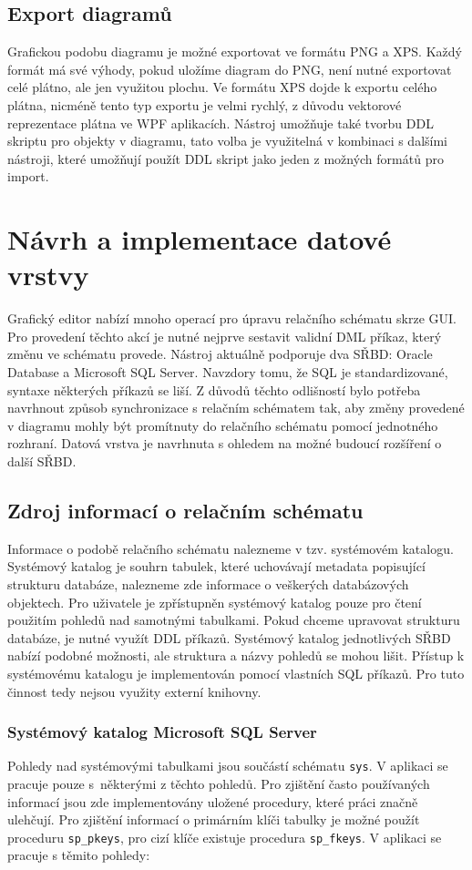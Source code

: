 \documentclass[czech,bachelor,public,dept460,male,oneside]{diploma}
\begin{document}
	\subsection{Export diagramů}
	Grafickou podobu diagramu je možné exportovat ve formátu PNG a XPS. Každý formát má své výhody, pokud uložíme diagram do PNG, není nutné exportovat celé plátno, ale jen využitou plochu. Ve formátu XPS dojde k exportu celého plátna, nicméně tento typ exportu je velmi rychlý, z důvodu vektorové reprezentace plátna ve WPF aplikacích. Nástroj umožňuje také tvorbu DDL skriptu pro objekty v diagramu, tato volba je využitelná v kombinaci s dalšími nástroji, které umožňují použít DDL skript jako jeden z možných formátů pro import.
		
\newpage
\section{Návrh a implementace datové vrstvy}
Grafický editor nabízí mnoho operací pro úpravu relačního schématu skrze GUI. Pro provedení těchto akcí je nutné nejprve sestavit validní DML příkaz, který změnu ve schématu provede. Nástroj aktuálně podporuje dva SŘBD: Oracle Database a Microsoft SQL Server. Navzdory tomu, že SQL je standardizované, syntaxe některých příkazů se liší. Z důvodů těchto odlišností bylo potřeba navrhnout způsob synchronizace s relačním schématem tak, aby změny provedené v diagramu mohly být promítnuty do relačního schématu pomocí jednotného rozhraní. Datová vrstva je navrhnuta s ohledem na možné budoucí rozšíření o další SŘBD.
	
	\subsection{Zdroj informací o relačním schématu} \label{secDataSource}
	Informace o podobě relačního schématu nalezneme v tzv. systémovém katalogu. Systémový katalog je souhrn tabulek, které uchovávají metadata popisující strukturu databáze, nalezneme zde informace o veškerých databázových objektech. Pro uživatele je zpřístupněn systémový katalog pouze pro čtení použitím pohledů nad samotnými tabulkami. Pokud chceme upravovat strukturu databáze, je nutné využít DDL příkazů. Systémový katalog jednotlivých SŘBD nabízí podobné možnosti, ale struktura a názvy pohledů se mohou lišit. Přístup k systémovému katalogu je implementován pomocí vlastních SQL příkazů. Pro tuto činnost tedy nejsou využity externí knihovny.
	
  		\subsubsection{Systémový katalog Microsoft SQL Server}
  		Pohledy nad systémovými tabulkami jsou součástí schématu \texttt{sys}. V aplikaci se pracuje pouze s~některými z těchto pohledů. Pro zjištění často používaných informací jsou zde implementovány uložené procedury, které práci značně ulehčují. Pro zjištění informací o primárním klíči tabulky je možné použít proceduru \texttt{sp\_pkeys}, pro cizí klíče existuje procedura \texttt{sp\_fkeys}. V aplikaci se pracuje s těmito pohledy: 
  		
\end{document}
